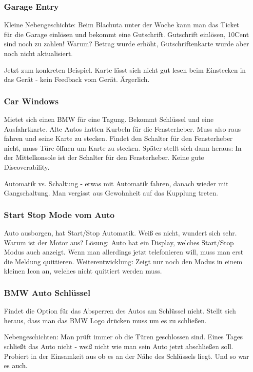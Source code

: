 \subsubsection{Garage Entry}
Kleine Nebengeschichte: Beim Blachuta unter der Woche kann man das Ticket für die Garage einlösen und bekommt eine Gutschrift. 
Gutschrift einlösen, 10Cent sind noch zu zahlen! 
Warum? 
Betrag wurde erhöht, Gutschriftenkarte wurde aber noch nicht aktualisiert.

Jetzt zum konkreten Beispiel.
Karte lässt sich nicht gut lesen beim Einstecken in das Gerät - kein Feedback vom Gerät. 
Ärgerlich.

\subsubsection{Car Windows}
Mietet sich einen BMW für eine Tagung. 
Bekommt Schlüssel und eine Ausfahrtkarte. 
Alte Autos hatten Kurbeln für die Fensterheber. 
Muss also raus fahren und seine Karte zu stecken. 
Findet den Schalter für den Fensterheber nicht, muss Türe öffnen um Karte zu stecken. 
Später stellt sich dann heraus: In der Mittelkonsole ist der Schalter für den 
Fensterheber. 
Keine gute Discoverability. 

Automatik vs. Schaltung - etwas mit Automatik fahren, danach wieder mit Gangschaltung.
Man vergisst aus Gewohnheit auf das Kupplung treten. 

\subsubsection{Start Stop Mode vom Auto}
Auto ausborgen, hat Start/Stop Automatik. Weiß es nicht, wundert sich sehr. Warum ist der Motor aus?
Lösung: Auto hat ein Display, welches Start/Stop Modus auch anzeigt.
Wenn man allerdings jetzt telefonieren will, muss man erst die Meldung quittieren. 
Weiterentwicklung: Zeigt nur noch den Modus in einem kleinen Icon an, welches nicht
quittiert werden muss. 

\subsubsection{BMW Auto Schlüssel}
Findet die Option für das Absperren des Autos am Schlüssel nicht. 
Stellt sich heraus, dass man das BMW Logo drücken muss um es zu schließen. 

Nebengeschichten:
Man prüft immer ob die Türen geschlossen sind. 
Eines Tages schließt das Auto nicht - weiß nicht wie man sein Auto jetzt abschließen soll. 
Probiert in der Einsamkeit aus ob es an der Nähe des Schlüssels liegt. 
Und so war es auch. 

